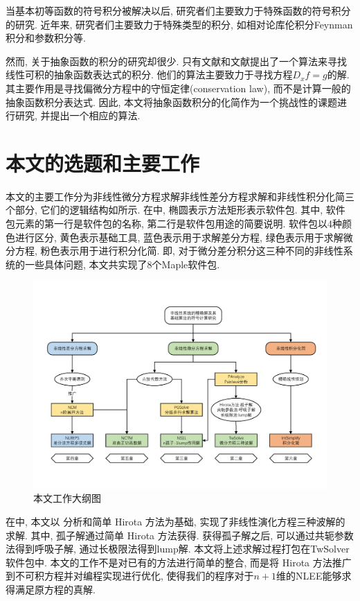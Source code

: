 当基本初等函数的符号积分被解决以后, 研究者们主要致力于特殊函数的符号积分的研究\citep{cherry1985,cherry1986,bertrand1994,jeffrey1997}. 近年来, 研究者们主要致力于特殊类型的积分, 如相对论库伦积分\citep{paule2012,paule2013}\D Feynman积分\citep{blumlein2012,smirnov2015}和参数积分\citep{raab2016}等.

然而, 关于抽象函数的积分的研究却很少. 只有文献\cite{deconinck2009}和文献\cite{poole2010}提出了一个算法来寻找线性可积的抽象函数表达式的积分. 他们的算法主要致力于寻找方程$D_x f=g$的解. 其主要作用是寻找偏微分方程中的守恒定律(conservation law)\citep{poole2011}, 而不是计算一般的抽象函数积分表达式. 因此, 本文将抽象函数积分的化简作为一个挑战性的课题进行研究, 并提出一个相应的算法.

\section{本文的选题和主要工作}
本文的主要工作分为非线性微分方程求解\D 非线性差分方程求解和非线性积分化简三个部分, 它们的逻辑结构如所示. 在中, 椭圆表示方法\D 矩形表示软件包. 其中, 软件包元素的第一行是软件包的名称, 第二行是软件包用途的简要说明. 软件包以4种颜色进行区分, 黄色表示基础工具, 蓝色表示用于求解差分方程, 绿色表示用于求解微分方程, 粉色表示用于进行积分化简. 即, 对于微分\D 差分\D 积分这三种不同的非线性系统的一些具体问题, 本文共实现了8个Maple软件包.

\begin{figure}[htbp]
\includegraphics[width=\textwidth]{fig/outline.pdf}
\caption{本文工作大纲图}\label{outline}
\end{figure}

在中, 本文以 \Painleve{} 分析和简单 Hirota 方法为基础, 实现了非线性演化方程三种波解的求解. 其中, 孤子解通过简单 Hirota 方法获得. 获得孤子解之后, 可以通过共轭参数法得到呼吸子解, 通过长极限法得到lump解. 本文将上述求解过程打包在TwSolver软件包中. 本文的工作不是对已有的方法进行简单的整合, 而是将 Hirota 方法推广到不可积方程并对编程实现进行优化, 使得我们的程序对于$n+1$维的NLEE能够求得满足原方程的真解. 

